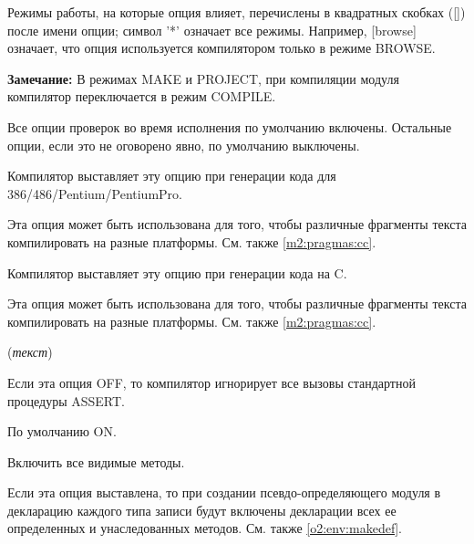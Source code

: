 Режимы работы, на которые опция влияет, перечислены в квадратных скобках
([])  после имени опции; символ
'*' означает все режимы. Например, [browse]
означает, что опция используется компилятором только в режиме BROWSE.

{\bf Замечание:} В режимах MAKE и PROJECT, при компиляции модуля компилятор
переключается в режим COMPILE.

Все опции проверок во время исполнения по умолчанию включены.
Остальные опции, если это не оговорено явно, по умолчанию выключены.

\newcommand{\inline}{({\em текст})}
\newcommand{\header}{({\em заголовок})}

\ifonline \else
\begin{description}
\fi

        \MLBegin{}\ModeC{}\MLEnd{}

        
Компилятор выставляет эту опцию при генерации кода для
386/486/Pentium/PentiumPro.

Эта опция может быть использована для того, чтобы различные 
фрагменты текста компилировать на разные платформы.
См. также \ref{m2:pragmas:cc}.

        \MLBegin{}\ModeC{}\MLEnd{}

Компилятор выставляет эту опцию при генерации кода на C.

Эта опция может быть использована для того, чтобы различные 
фрагменты текста компилировать на разные платформы.
См. также \ref{m2:pragmas:cc}.

        \MLBegin{}\ModeC{}\MLEnd{} \inline

Если эта опция OFF, то компилятор игнорирует все вызовы стандартной
процедуры  ASSERT.

По умолчанию ON.


        \MLBegin{}\ModeB{}\MLEnd{}

Включить все видимые методы.

Если эта опция выставлена, то при создании псевдо-определяющего модуля
в декларацию каждого типа записи будут включены
декларации всех ее определенных и унаследованных методов. 
См. также \ref{o2:env:makedef}.


\end{description}

